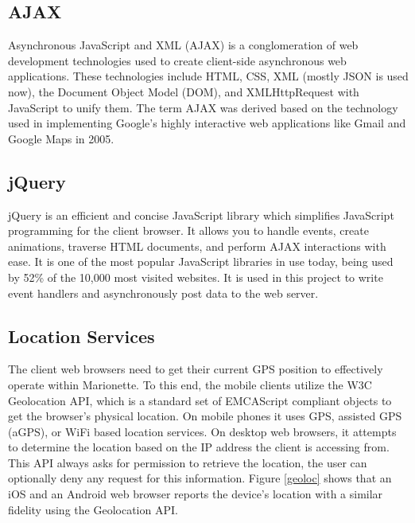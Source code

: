 \documentclass[12pt]{report}	%
\theoremstyle{definition}
\theoremstyle{remark}
\begin{document}
\subsection{AJAX}

Asynchronous JavaScript and XML (AJAX) is a conglomeration of web
development technologies used to create client-side asynchronous web
applications. These technologies include HTML, CSS, XML (mostly JSON is
used now), the Document Object Model (DOM), and XMLHttpRequest with
JavaScript to unify them. The term AJAX was derived based on the
technology used in implementing Google's highly interactive web
applications like Gmail and Google Maps in 2005.

\subsection{jQuery}

jQuery is an efficient and concise JavaScript library which simplifies
JavaScript programming for the client browser. It allows you to handle
events, create animations, traverse HTML documents, and perform AJAX
interactions with ease. It is one of the most popular JavaScript
libraries in use today, being used by 52\% of the 10,000 most visited
websites. It is used in this project to write event handlers and
asynchronously post data to the web server.

\subsection{Location Services}

The client web browsers need to get their current GPS position to
effectively operate within Marionette. To this end, the mobile clients
utilize the W3C Geolocation API, which is a standard set of EMCAScript
compliant objects to get the browser's physical location. On mobile
phones it uses GPS, assisted GPS (aGPS), or WiFi based location
services. On desktop web browsers, it attempts to determine the location
based on the IP address the client is accessing from. This API always
asks for permission to retrieve the location, the user can optionally deny
any request for this information. Figure \ref{geoloc}
shows that an iOS and an Android web browser reports the device's
location with a similar fidelity using the Geolocation API.
\end{document}
